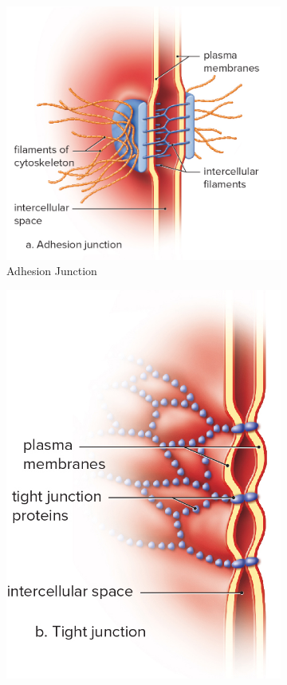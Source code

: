 \documentclass[a4paper,kul]{kulakarticle} %
\begin{document}
\begin{figure}[h]
	\centering
	\begin{subfigure}{.33\textwidth}
		\centering
		\includegraphics[width=1\linewidth]{Adhesie_Junctie}
		\caption{Adhesion Junction}
		\label{fig:Adhesie}
	\end{subfigure}%
	\begin{subfigure}{.33\textwidth}
		\centering
		\includegraphics[width=0.7\linewidth]{Tight_Junctie}

\end{subfigure}
\end{figure}
\end{document}
